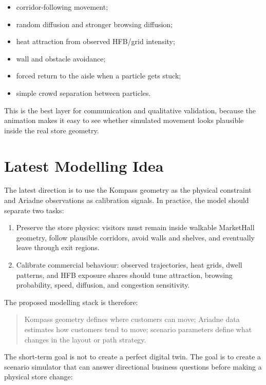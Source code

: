 \documentclass[11pt,a4paper]{article}
\begin{document}
\begin{itemize}[leftmargin=*]
    \item corridor-following movement;
    \item random diffusion and stronger browsing diffusion;
    \item heat attraction from observed HFB/grid intensity;
    \item wall and obstacle avoidance;
    \item forced return to the aisle when a particle gets stuck;
    \item simple crowd separation between particles.
\end{itemize}

This is the best layer for communication and qualitative validation, because the animation makes it easy to see whether simulated movement looks plausible inside the real store geometry.

\section{Latest Modelling Idea}

The latest direction is to use the Kompass geometry as the physical constraint and Ariadne observations as calibration signals. In practice, the model should separate two tasks:

\begin{enumerate}[leftmargin=*]
    \item Preserve the store physics: visitors must remain inside walkable MarketHall geometry, follow plausible corridors, avoid walls and shelves, and eventually leave through exit regions.
    \item Calibrate commercial behaviour: observed trajectories, heat grids, dwell patterns, and HFB exposure shares should tune attraction, browsing probability, speed, diffusion, and congestion sensitivity.
\end{enumerate}

The proposed modelling stack is therefore:

\begin{quote}
Kompass geometry defines where customers can move; Ariadne data estimates how customers tend to move; scenario parameters define what changes in the layout or path strategy.
\end{quote}

The short-term goal is not to create a perfect digital twin. The goal is to create a scenario simulator that can answer directional business questions before making a physical store change:
\end{document}
